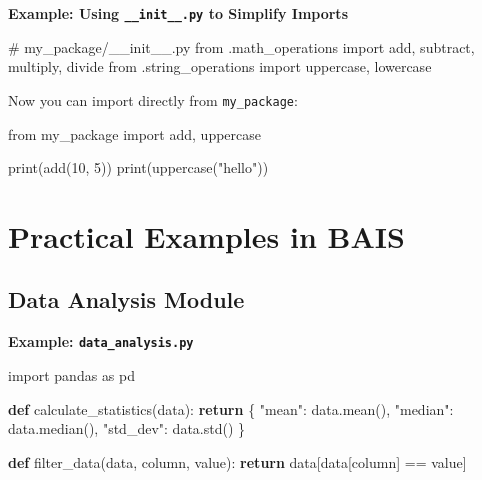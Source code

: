 \documentclass[
  letterpaper,
  DIV=11,
  numbers=noendperiod]{scrreprt}
\newenvironment{Shaded}{\begin{snugshade}}{\end{snugshade}}
\newcommand{\BuiltInTok}[1]{\textcolor[rgb]{0.00,0.23,0.31}{#1}}
\newcommand{\CommentTok}[1]{\textcolor[rgb]{0.37,0.37,0.37}{#1}}
\newcommand{\ControlFlowTok}[1]{\textcolor[rgb]{0.00,0.23,0.31}{\textbf{#1}}}
\newcommand{\DecValTok}[1]{\textcolor[rgb]{0.68,0.00,0.00}{#1}}
\newcommand{\ImportTok}[1]{\textcolor[rgb]{0.00,0.46,0.62}{#1}}
\newcommand{\KeywordTok}[1]{\textcolor[rgb]{0.00,0.23,0.31}{\textbf{#1}}}
\newcommand{\NormalTok}[1]{\textcolor[rgb]{0.00,0.23,0.31}{#1}}
\newcommand{\OperatorTok}[1]{\textcolor[rgb]{0.37,0.37,0.37}{#1}}
\newcommand{\StringTok}[1]{\textcolor[rgb]{0.13,0.47,0.30}{#1}}
\begin{document}
\textbf{Example: Using \texttt{\_\_init\_\_.py} to Simplify Imports}

\begin{Shaded}
\begin{Highlighting}[]
\CommentTok{\# my\_package/\_\_init\_\_.py}
\ImportTok{from}\NormalTok{ .math\_operations }\ImportTok{import}\NormalTok{ add, subtract, multiply, divide}
\ImportTok{from}\NormalTok{ .string\_operations }\ImportTok{import}\NormalTok{ uppercase, lowercase}
\end{Highlighting}
\end{Shaded}

Now you can import directly from \texttt{my\_package}:

\begin{Shaded}
\begin{Highlighting}[]
\ImportTok{from}\NormalTok{ my\_package }\ImportTok{import}\NormalTok{ add, uppercase}

\BuiltInTok{print}\NormalTok{(add(}\DecValTok{10}\NormalTok{, }\DecValTok{5}\NormalTok{))}
\BuiltInTok{print}\NormalTok{(uppercase(}\StringTok{"hello"}\NormalTok{))}
\end{Highlighting}
\end{Shaded}

\section{Practical Examples in BAIS}\label{practical-examples-in-bais-1}

\subsection{Data Analysis Module}\label{data-analysis-module}

\textbf{Example: \texttt{data\_analysis.py}}

\begin{Shaded}
\begin{Highlighting}[]
\ImportTok{import}\NormalTok{ pandas }\ImportTok{as}\NormalTok{ pd}

\KeywordTok{def}\NormalTok{ calculate\_statistics(data):}
    \ControlFlowTok{return}\NormalTok{ \{}
        \StringTok{"mean"}\NormalTok{: data.mean(),}
        \StringTok{"median"}\NormalTok{: data.median(),}
        \StringTok{"std\_dev"}\NormalTok{: data.std()}
\NormalTok{    \}}

\KeywordTok{def}\NormalTok{ filter\_data(data, column, value):}
    \ControlFlowTok{return}\NormalTok{ data[data[column] }\OperatorTok{==}\NormalTok{ value]}
\end{Highlighting}
\end{Shaded}
\end{document}
